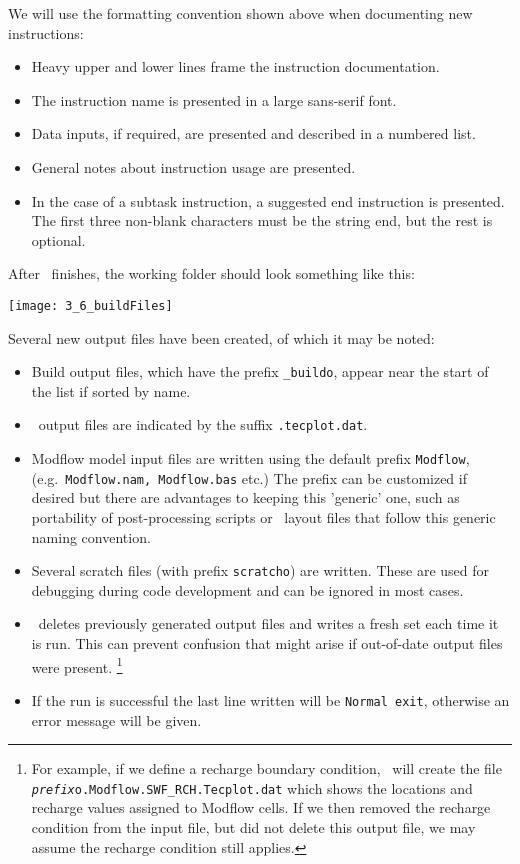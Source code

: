 We will use the formatting convention shown above when documenting new instructions:
\begin{itemize}
  \item Heavy upper and lower lines frame the instruction documentation.
  \item The instruction name is presented in a large sans-serif font.
  \item Data inputs, if required, are presented and described in a numbered list.
  \item General notes about instruction usage are presented.
  \item In the case of a subtask instruction, a suggested \textsf{end} instruction is presented.  The first three non-blank characters must be the string \textsf{end}, but the rest is optional.
\end{itemize}

After \mut\ finishes, the working folder should look something like this:

        \texttt{[image: 3\_6\_buildFiles]}

Several new output files have been created, of which it may be noted:
\begin{itemize}
    \item Build output files, which have the prefix \texttt{\_buildo}, appear near the start of the list if sorted by name.
    \item \tecplot\ output files are indicated by the suffix \texttt{.tecplot.dat}.
    \item Modflow model input files are written using the default prefix \texttt{Modflow}, (e.g.\ \texttt{Modflow.nam, Modflow.bas} etc.)  The prefix can be customized if desired but there are advantages to keeping this 'generic' one, such as portability of post-processing scripts or \tecplot\ layout files that follow this generic naming convention.
    \item Several scratch files (with prefix \texttt{scratcho}) are written. These are used for debugging during code development and can be ignored in most cases.
    \item \mut\ deletes previously generated output files and writes a fresh set each time it is run.  This can prevent confusion that might arise if out-of-date output files were present.
        \footnote{For example, if we define a recharge boundary condition, \mut\ will create the file \texttt{\textit{prefix}o.Modflow.SWF\_RCH.Tecplot.dat} which shows the locations and recharge values assigned to Modflow cells.  If we then removed the recharge condition from the input file, but did not delete this output file, we may assume the recharge condition still applies.}
    \item If the run is successful the last line written will be \texttt{Normal exit}, otherwise an error message will be given.
\end{itemize}

